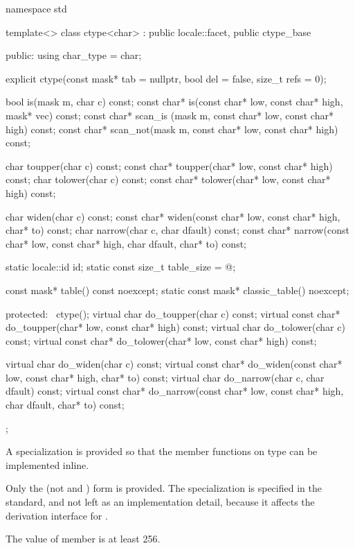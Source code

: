 %
\begin{codeblock}
namespace std {
  template<>
    class ctype<char> : public locale::facet, public ctype_base {
    public:
      using char_type = char;

      explicit ctype(const mask* tab = nullptr, bool del = false, size_t refs = 0);

      bool is(mask m, char c) const;
      const char* is(const char* low, const char* high, mask* vec) const;
      const char* scan_is (mask m, const char* low, const char* high) const;
      const char* scan_not(mask m, const char* low, const char* high) const;

      char        toupper(char c) const;
      const char* toupper(char* low, const char* high) const;
      char        tolower(char c) const;
      const char* tolower(char* low, const char* high) const;

      char  widen(char c) const;
      const char* widen(const char* low, const char* high, char* to) const;
      char  narrow(char c, char dfault) const;
      const char* narrow(const char* low, const char* high, char dfault, char* to) const;

      static locale::id id;
      static const size_t table_size = @\impdef@;

      const mask* table() const noexcept;
      static const mask* classic_table() noexcept;

    protected:
      ~ctype();
      virtual char        do_toupper(char c) const;
      virtual const char* do_toupper(char* low, const char* high) const;
      virtual char        do_tolower(char c) const;
      virtual const char* do_tolower(char* low, const char* high) const;

      virtual char        do_widen(char c) const;
      virtual const char* do_widen(const char* low, const char* high, char* to) const;
      virtual char        do_narrow(char c, char dfault) const;
      virtual const char* do_narrow(const char* low, const char* high,
                                    char dfault, char* to) const;
    };
}
\end{codeblock}

\pnum
A specialization  is provided
so that the member functions on type  can be implemented inline.
\begin{footnote}
Only the  (not  and )
form is provided.
The specialization is specified in the standard,
and not left as an implementation detail,
because it affects the derivation interface for .
\end{footnote}
The  value of
member  is at least 256.

